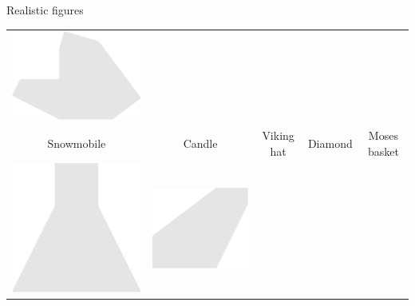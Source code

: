 \documentclass[14pt]{beamer}
\begin{document}
\begin{frame}{Realistic figures}
\begin{center}
{\begin{tabular}{ccccc}
                \!\!\includegraphics[scale=0.20]{figures/figure026ay.pdf} \!\!\\
                Snowmobile & Candle & \;Viking hat & Diamond & Moses basket\\[3.5ex]
                \!\!\includegraphics[scale=0.20]{figures/figure026g.pdf}  \!\!&
                \!\!\includegraphics[scale=0.20]{figures/figure026aw.pdf} \!\!&

\end{tabular}}
\end{center}
\end{frame}
\end{document}
